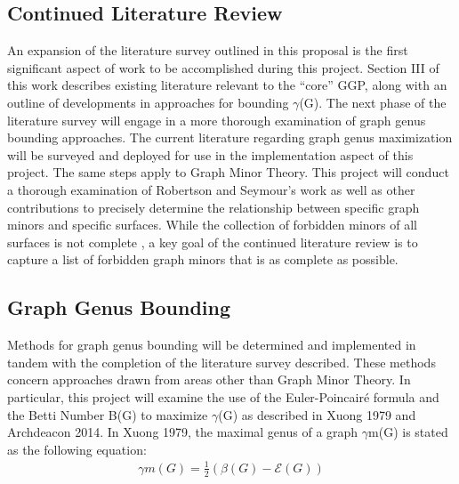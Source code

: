 \documentclass[12pt,conference]{IEEEtran}
\begin{document}
\subsection{Continued Literature Review}

An expansion of the literature survey outlined in this proposal is the first significant aspect of work to be accomplished during this project. Section III of this work describes existing literature relevant to the ``core'' GGP, along with an outline of developments in approaches for bounding $\gamma$(G). The next phase of the literature survey will engage in a more thorough examination of graph genus bounding approaches. The current literature regarding graph genus maximization will be surveyed and deployed for use in the implementation aspect of this project. The same steps apply to Graph Minor Theory. This project will conduct a thorough examination of Robertson and Seymour's work as well as other contributions to precisely determine the relationship between specific graph minors and specific surfaces. While the collection of forbidden minors of all surfaces is not complete \cite{thomas}, a key goal of the continued literature review is to capture a list of forbidden graph minors that is as complete as possible.


\subsection{Graph Genus Bounding}

Methods for graph genus bounding will be determined and implemented in tandem with the completion of the literature survey described. These methods concern approaches drawn from areas other than Graph Minor Theory. In particular, this project will examine the use of the Euler-Poincair\'e formula and the Betti Number B(G) to maximize $\gamma$(G) as described in Xuong 1979 and Archdeacon 2014. In Xuong 1979, the maximal genus of a graph $\gamma$m(G) is stated as the following equation:
\begin{align*}
\gamma m(G) = \frac{1}{2}(\beta(G) - \mathcal{E}(G))
\end{align*}
\end{document}
